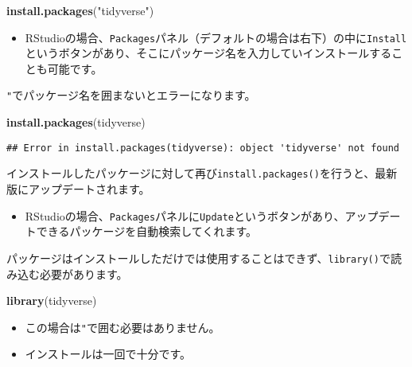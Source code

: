 \documentclass[]{bxjsarticle}
\newenvironment{Shaded}{\begin{snugshade}}{\end{snugshade}}
\newcommand{\KeywordTok}[1]{\textcolor[rgb]{0.13,0.29,0.53}{\textbf{#1}}}
\newcommand{\NormalTok}[1]{#1}
\newcommand{\StringTok}[1]{\textcolor[rgb]{0.31,0.60,0.02}{#1}}
\providecommand{\tightlist}{%
  \setlength{\itemsep}{0pt}\setlength{\parskip}{0pt}}
\begin{document}
\begin{Shaded}
\begin{Highlighting}[]
\KeywordTok{install.packages}\NormalTok{(}\StringTok{"tidyverse"}\NormalTok{)}
\end{Highlighting}
\end{Shaded}

\begin{itemize}
\tightlist
\item
  RStudioの場合、\texttt{Packages}パネル（デフォルトの場合は右下）の中に\texttt{Install}というボタンがあり、そこにパッケージ名を入力していインストールすることも可能です。
\end{itemize}

\texttt{"}でパッケージ名を囲まないとエラーになります。

\begin{Shaded}
\begin{Highlighting}[]
\KeywordTok{install.packages}\NormalTok{(tidyverse)}
\end{Highlighting}
\end{Shaded}

\begin{verbatim}
## Error in install.packages(tidyverse): object 'tidyverse' not found
\end{verbatim}

インストールしたパッケージに対して再び\texttt{install.packages()}を行うと、最新版にアップデートされます。

\begin{itemize}
\tightlist
\item
  RStudioの場合、\texttt{Packages}パネルに\texttt{Update}というボタンがあり、アップデートできるパッケージを自動検索してくれます。
\end{itemize}

パッケージはインストールしただけでは使用することはできず、\texttt{library()}で読み込む必要があります。

\begin{Shaded}
\begin{Highlighting}[]
\KeywordTok{library}\NormalTok{(tidyverse)}
\end{Highlighting}
\end{Shaded}

\begin{itemize}
\tightlist
\item
  この場合は\texttt{"}で囲む必要はありません。
\item
  インストールは一回で十分です。
\end{itemize}
\end{document}
